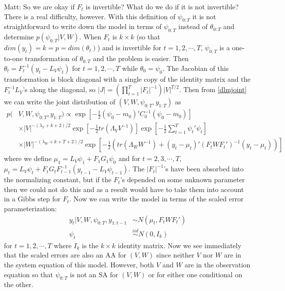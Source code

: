 \documentclass{article}
\newcommand{\matt}[1]{{\color{red} Matt: #1}}
\begin{document}
\matt{So we are okay if $F_t$ is invertible? What do we do if it is not invertible?}
There is a real difficulty, however. With this definition of $\psi_{0:T}$ it is not straightforward to write down the model in terms of $\psi_{0:T}$ instead of $\theta_{0:T}$ and determine $p(\psi_{0:T}|V,W)$. When $F_t$ is $k\times k$ (so that $dim(y_t)=k=p=dim(\theta_t)$) and is invertible for $t=1,2,\cdots,T$, $\psi_{0:T}$ is a one-to-one transformation of $\theta_{0:T}$ and the problem is easier. Then $\theta_t = F_t^{-1}(y_t - L_V\psi_t)$ for $t=1,2,\cdots,T$ while $\theta_0=\psi_0$. The Jacobian of this transformation is block diagonal with a single copy of the identity matrix and the $F_t^{-1}L_V$'s along the diagonal, so $|J|=(\prod_{t=1}^T|F_t|^{-1})|V|^{T/2}$. Then from \eqref{dlmjoint} we can write the joint distribution of $(V, W, \psi_{0:T}, y_{1:T})$ as
\begin{align}
    p(&V,W,\psi_{0:T},y_{1:T}) \propto \exp\left[-\frac{1}{2}(\psi_0-m_0)'C_0^{-1}(\psi_0-m_0)\right] \nonumber\\
  &\times |V|^{-(\lambda_V + k + 2)/2}\exp\left[-\frac{1}{2}tr\left(\Lambda_VV^{-1}\right)\right] \exp\left[-\frac{1}{2}\sum_{t=1}^T\psi_t'\psi_t\right] \nonumber\\
   & \times |W|^{-(\lambda_W + k + T + 2)/2}\exp\left[-\frac{1}{2}\left(tr\left(\Lambda_WW^{-1}\right) + (y_t - \mu_t)'(F_tWF_t')^{-1}(y_t-\mu_t)\right)\right]\label{dlmerrorjoint}
\end{align}
where we define $\mu_1 = L_V\psi_1 + F_1G_1\psi_0$ and for $t=2,3,\cdots,T$, $\mu_t =L_V\psi_t + F_tG_tF_{t-1}^{-1}(y_{t-1} - L_{V}\psi_{t-1})$. The $|F_t|^{-1}$'s have been absorbed into the normalizing constant, but if the $F_t$'s depended on some unknown parameter then we could not do this and as a result would have to take them into account in a Gibbs step for $F_t$. Now we can write the model in terms of the scaled error parameterization:
\begin{align*}
  y_t|V,W,\psi_{0:T},y_{1:t-1} &\sim N(\mu_t, F_tWF_t')\\
  \psi_t & \stackrel{iid}{\sim} N(0,I_k)
\end{align*}
for $t=1,2,\cdots,T$ where $I_k$ is the $k\times k$ identity matrix. Now we see immediately that the scaled errors are also an AA for $(V,W)$ since neither $V$ nor $W$ are in the system equation of this model. However, both $V$ and $W$ are in the observation equation so that $\psi_{0:T}$ is not an SA for $(V,W)$ or for either one conditional on the other.
\end{document}
